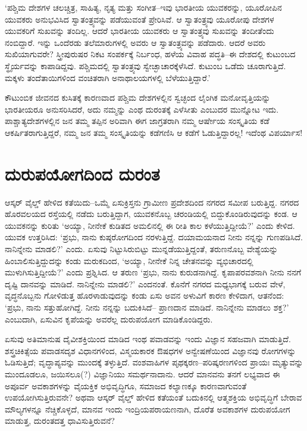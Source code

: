 \newpage

‘ಪಶ್ಚಿಮ ದೇಶಗಳ ಚಲಚ್ಚಿತ್ರ, ಸಾಹಿತ್ಯ, ನೃತ್ಯ ಮತ್ತು ಸಂಗೀತ–ಇವು ಭಾರತೀಯ ಯುವಕ\-ರನ್ನು, ಯೂರೋಪಿನ ಯುವಕರು ಅನುಭವಿಸಿದ ಸ್ವಾತಂತ್ರ್ಯವನ್ನು ಪಡೆಯುವಂತೆ ಪ್ರೇರಿಸಿವೆ. ಆ ಸ್ವಾತಂತ್ರ್ಯವು ಯೂರೋಪು ದೇಶಗಳ ಯುವಕರಿಗೆ ಸುಖವನ್ನು ತಂದಿಲ್ಲ. ಆದರೆ ಭಾರತೀಯ ಯುವಕರು ಆ ಸ್ವಾತಂತ್ರ್ಯವು ಸುಖವನ್ನು ತಂದೀತೆಂದು ನಂಬಿದ್ದಾರೆ. ಇನ್ನು ಒಂದೆರಡು ತಲೆಮಾರುಗಳಲ್ಲಿ ಅವರು ಆ ಸ್ವಾತಂತ್ರ್ಯವನ್ನು ಪಡೆದಾರು. ಆದರೆ ಅವರು ಸುಖಿಯಾಗುವರೇ? ಸ್ತ್ರೀಪುರುಷರ ನಿಕಟ ಸಂಪರ್ಕಕ್ಕೆ ನಿರ್ಬಂಧ, ಹಳೆಯ ವಿವಾಹ ಪದ್ಧತಿ–ಈ ದೇಶದಲ್ಲಿ ಕುಟುಂಬದ ಸ್ಥೈರ್ಯವನ್ನು ಕಾಪಾಡಿದ್ದವು. ಪಶ್ಚಿಮದಲ್ಲಿ ಸ್ವಾತಂತ್ರ್ಯವು ಸ್ವೇಚ್ಛಾಚಾರಕ್ಕೆಳೆಸಿದೆ. ಕುಟುಂಬ ಒಡೆದು ಚೂರಾಗುತ್ತಿದೆ. ಮಕ್ಕಳು ತಂದೆತಾಯಿಗಳಿಂದ ವಂಚಿತರಾಗಿ ಅನಾಥಾಲಯಗಳಲ್ಲಿ ಬೆಳೆಯುತ್ತಿದ್ದಾರೆ.’

ಕೌಟುಂಬಿಕ ಜೀವನದ ಕುಸಿತಕ್ಕೆ ಕಾರಣವಾದ ಪಶ್ಚಿಮ ದೇಶಗಳಲ್ಲಿನ ಸ್ವಚ್ಛಂದ ಲೈಂಗಿಕ ಮನೋವೃತ್ತಿಯನ್ನು ಭಾರತೀಯರೂ ಅನುಸರಿಸಿದರೆ, ಅದು ನಮ್ಮನ್ನು ಎಂಥ ದುರಂತಕ್ಕೆ ಎಳೆಸೀತು ಎಂಬುದರ ಮುನ್ನೋಟ ಇದು. ಪಾಶ್ಚಾತ್ಯದೇಶಗಳಲ್ಲಿನ ಜನ ತಮ್ಮ ತಪ್ಪಿನ ಅರಿವಾಗಿ ಈಗ ಜಾಗ್ರತರಾಗಿ ನಮ್ಮ ಆರ್ಷೇಯ ಸಂಸ್ಕೃತಿಯ ಕಡೆ ಆಕರ್ಷಿತರಾಗುತ್ತಿದ್ದರೆ, ನಮ್ಮ ಜನ ತಮ್ಮ ಸಂಸ್ಕೃತಿಯನ್ನು ಕಡೆಗಣಿಸಿ ಆ ಕಡೆಗೆ ಓಡುತ್ತಿದ್ದಾರಲ್ಲ! ಇದೆಂಥ ವಿಪರ್ಯಾಸ!


\section*{ದುರುಪಯೋಗದಿಂದ ದುರಂತ}


ಆಸ್ಕರ್ ವೈಲ್ಡ್ ಹೇಳಿದ ಕತೆಯಿದು–ಒಮ್ಮೆ ಏಸುಕ್ರಿಸ್ತನು ಗ್ರಾಮೀಣ ಪ್ರದೇಶದಿಂದ ನಗರದ ಸಮೀಪ ಬರುತ್ತಿದ್ದ. ನಗರದ ಹೊರವಲಯದ ರಸ್ತೆಯಲ್ಲಿ ನಡೆದು ಬರುತ್ತಿದ್ದಾಗ, ಯುವಕನೊಬ್ಬ ಚರಂಡಿಯಲ್ಲಿ ಬಿದ್ದುಕೊಂಡಿರುವುದನ್ನು ಕಂಡ. ಆ ಯುವಕನನ್ನು ಕುರಿತು ‘ಅಯ್ಯಾ, ನೀನೇಕೆ ಕುಡಿತದ ಅಮಲಿನಲ್ಲಿ ಈ ರೀತಿ ಕಾಲ ಕಳೆಯುತ್ತಿದ್ದೀಯೆ?’ ಎಂದು ಕೇಳಿದ. ಯುವಕ ಉತ್ತರಿಸಿದ: ‘ಪ್ರಭು, ನಾನು ಕುಷ್ಠರೋಗದಿಂದ ನರಳುತ್ತಿದ್ದೆ. ದಯಾಮಯನಾದ ನೀನು ನನ್ನನ್ನು ಗುಣ\-ಪಡಿಸಿದೆ. ನಾನಿನ್ನೇನು ಮಾಡಲಿ?’ ಎಂದು. ಏಸುವು ನಿಟ್ಟುಸಿರುಬಿಟ್ಟು ಮುನ್ನಡೆಯುತ್ತಿದ್ದಂತೆ, ತರುಣನೊಬ್ಬ ವೇಶ್ಯೆಯನ್ನು ಹಿಂಬಾಲಿಸುತ್ತಿದ್ದುದನ್ನು ಕಂಡು ಮರುಕದಿಂದ, ‘ಅಯ್ಯಾ, ನೀನೇಕೆ ನಿನ್ನ ಚೇತನವನ್ನು ವ್ಯಭಿಚಾರದಲ್ಲಿ ಮುಳುಗಿಸುತ್ತಿದ್ದೀಯೆ?’ ಎಂದು ಪ್ರಶ್ನಿಸಿದ. ಆ ತರುಣ ‘ಪ್ರಭು, ನಾನು ಕುರುಡನಾಗಿದ್ದೆ. ಕೃಪಾಪರವಶನಾಗಿ ನೀನು ನನಗೆ ದೃಷ್ಟಿ ದಾನವನ್ನು ಮಾಡಿದೆ. ನಾನಿನ್ನೇನು ಮಾಡಲಿ?’ ಎಂದನಂತೆ. ಕೊನೆಗೆ ನಗರದ ಮಧ್ಯಭಾಗಕ್ಕೆ ಬರುವ ವೇಳೆ, ವೃದ್ಧ\-ನೊಬ್ಬನು ಗೋಳಿಡುತ್ತ ಹೊರಳಾಡುವುದನ್ನು ಕಂಡು ಏಸು ಅವನ ಅಳುವಿಗೆ ಕಾರಣ ಕೇಳಿದಾಗ, ಆತನೆಂದ: ‘ಪ್ರಭು, ನಾನು ಸತ್ತುಹೋಗಿದ್ದೆ. ನೀನು ನನ್ನನ್ನು ಬದುಕಿಸಿದೆ– ಪ್ರಾಣದಾನ ಮಾಡಿದೆ. ನಾನಿನ್ನೇನು ಮಾಡಲು ಶಕ್ತ?’ ಎಂಬುದಾಗಿ, ಏಸುವಿನ ಕೃಪೆಯನ್ನು ಅವರೆಲ್ಲ ದುರುಪಯೋಗ ಮಾಡಿಕೊಂಡಿದ್ದರು.

ಏಸುವು ಅತಿಮಾನುಷ ದೈವೀಶಕ್ತಿಯಿಂದ ಮಾಡಿದ ಇಂಥ ಪವಾಡವನ್ನು ಇಂದು ವಿಜ್ಞಾನ ಸಹಜವಾಗಿ ಮಾಡುತ್ತಿದೆ. ಶಸ್ತ್ರಚಿಕಿತ್ಸೆಯ ಪವಾಡಸದೃಶ ವಿಧಾನಗಳಿಂದ, ವಿಸ್ಮಯಕಾರಕ ಔಷಧಗಳ ಅನ್ವೇಷಣೆಯಿಂದ ವಿಜ್ಞಾನವು ರೋಗಗಳನ್ನು ಓಡಿಸುತ್ತಿದೆ; ವೃದ್ಧಾಪ್ಯವನ್ನು ಮುಂದಕ್ಕೆ ತಳ್ಳುತ್ತಿದೆ. ವಂಶವಾಹಿಗಳ ಪೃಥಕ್ಕರಣ–ಪರಿಷ್ಕರಣಗಳಿಂದ ಪ್ರಾಯಃ ಮೃತ್ಯುವನ್ನು ಮುಂದೂ\-ಡಲೂ, ಜಯಿಸಲೂ(?) ವಿಜ್ಞಾನಿಯು ಸಮರ್ಥನಾದಾನು. ಆದರೆ ಮಾನವನು ತನಗೆ ಲಭ್ಯವಾದ ಈ ಅಪೂರ್ವ ಅವಕಾಶಗಳನ್ನು ವೈಯಕ್ತಿಕ ಅಭಿವೃದ್ಧಿಗೂ, ಸಮಾಜದ ಕಲ್ಯಾಣಕ್ಕೂ ಕಾರಣವಾಗುವಂತೆ ಉಪಯೋಗಿಸುತ್ತಿರುವನೇ? ಅಥವಾ ಆಸ್ಕರ್ ವೈಲ್ಡ್ ಹೇಳಿದ ಕತೆಯಂತೆ ಬದುಕಿನಲ್ಲಿ ಆತ್ಮಶಕ್ತಿಯ ಅಭಿವೃದ್ಧಿಗೆ ಬೇರಾವ ಮೌಲ್ಯಗಳನ್ನೂ ನೆಚ್ಚಿಕೊಳ್ಳದೆ, ಮಾನವ ಇಂದು ಇಂದ್ರಿಯಪರಾಯಣನಾಗಿ, ದೊರೆತ ಅವಕಾಶಗಳ ದುರುಪಯೋಗ ಮಾಡುತ್ತ, ದುರಂತದತ್ತ ಧಾವಿಸುತ್ತಿರುವನೆ?

